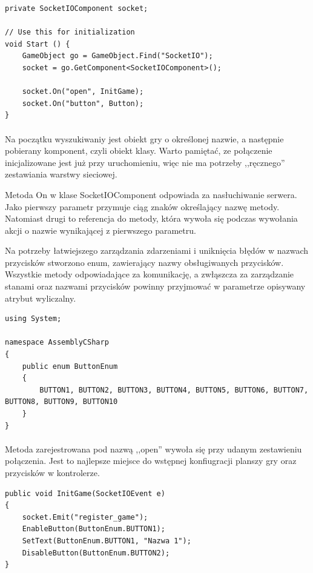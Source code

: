 \begin{lstlisting}[language=CSharp]
private SocketIOComponent socket;

// Use this for initialization
void Start () {
	GameObject go = GameObject.Find("SocketIO");
	socket = go.GetComponent<SocketIOComponent>();

	socket.On("open", InitGame);
	socket.On("button", Button);
}
\end{lstlisting}

\paragraph{}
Na początku wyszukiwaniy jest obiekt gry o określonej nazwie, a następnie pobierany komponent, czyli obiekt klasy. Warto pamiętać, ze połączenie inicjalizowane jest już przy uruchomieniu, więc nie ma potrzeby ,,ręcznego'' zestawiania warstwy sieciowej.

Metoda On w klase SocketIOComponent odpowiada za nasłuchiwanie serwera. Jako pierwszy parametr przymuje ciąg znaków określający nazwę metody. Natomiast drugi to referencja do metody, która wywoła się podczas wywołania akcji o nazwie wynikającej z pierwszego parametru.

Na potrzeby łatwiejszego zarządzania zdarzeniami i uniknięcia błędów w nazwach przycisków stworzono enum, zawierający nazwy obsługiwanych przycisków. Wszystkie metody odpowiadające za komunikację, a zwłąszcza za zarządzanie stanami oraz nazwami przycisków powinny przyjmować w parametrze opisywany atrybut wyliczalny.

\begin{lstlisting}[language=CSharp]
using System;

namespace AssemblyCSharp
{
	public enum ButtonEnum
	{
		BUTTON1, BUTTON2, BUTTON3, BUTTON4, BUTTON5, BUTTON6, BUTTON7, BUTTON8, BUTTON9, BUTTON10
	}
}

\end{lstlisting}

\paragraph{}
Metoda zarejestrowana pod nazwą ,,open'' wywoła się przy udanym zestawieniu połączenia. Jest to najlepsze miejsce do wstępnej konfiugracji planszy gry oraz przycisków w kontrolerze.

\begin{lstlisting}[language=CSharp]
public void InitGame(SocketIOEvent e)
{
	socket.Emit("register_game");
	EnableButton(ButtonEnum.BUTTON1);
	SetText(ButtonEnum.BUTTON1, "Nazwa 1");
	DisableButton(ButtonEnum.BUTTON2);
}
\end{lstlisting}

